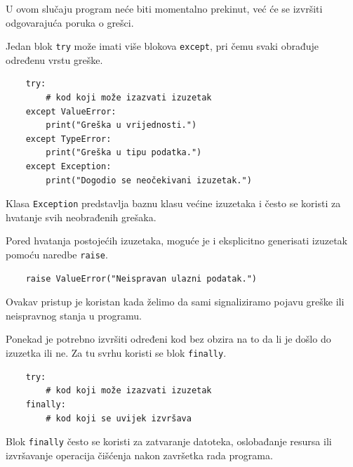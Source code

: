U ovom slučaju program neće biti momentalno prekinut, već će se izvršiti odgovarajuća poruka o grešci.


Jedan blok \texttt{try} može imati više blokova \texttt{except}, pri čemu svaki obrađuje određenu vrstu greške.

\begin{verbatim}
	try:
	    # kod koji može izazvati izuzetak
	except ValueError:
	    print("Greška u vrijednosti.")
	except TypeError:
	    print("Greška u tipu podatka.")
	except Exception:
	    print("Dogodio se neočekivani izuzetak.")
\end{verbatim}

Klasa \texttt{Exception} predstavlja baznu klasu većine izuzetaka i često se koristi za hvatanje svih neobrađenih grešaka.


Pored hvatanja postojećih izuzetaka, moguće je i eksplicitno generisati izuzetak pomoću naredbe \texttt{raise}.

\begin{verbatim}
	raise ValueError("Neispravan ulazni podatak.")
\end{verbatim}

Ovakav pristup je koristan kada želimo da sami signaliziramo pojavu greške ili neispravnog stanja u programu.


Ponekad je potrebno izvršiti određeni kod bez obzira na to da li je došlo do izuzetka ili ne. Za tu svrhu koristi se blok \texttt{finally}.

\begin{verbatim}
	try:
	    # kod koji može izazvati izuzetak
	finally:
	    # kod koji se uvijek izvršava
\end{verbatim}

Blok \texttt{finally} često se koristi za zatvaranje datoteka, oslobađanje resursa ili izvršavanje operacija čišćenja nakon završetka rada programa.

